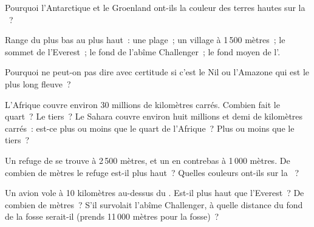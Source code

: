 \begin{exercise}[$\star$]\label{exo:g4:world-physical-map:6}
Pourquoi l'Antarctique et le Groenland ont-ils la couleur des terres hautes
sur la ~?
\end{exercise}

\begin{exercise}[$\star\star$]\label{exo:g4:world-physical-map:7}
Range du plus bas au plus haut~: une plage~; un village à 1\,500 mètres~;
le sommet de l'Everest~; le fond de l'abîme Challenger~; le fond moyen de
l'.
\end{exercise}

\begin{exercise}[$\star\star$]\label{exo:g4:world-physical-map:8}
Pourquoi ne peut-on pas dire avec certitude si c'est le Nil ou l'Amazone
qui est le plus long fleuve~?
\end{exercise}

\begin{exercise}[$\star\star$]\label{exo:g4:world-physical-map:9}
L'Afrique couvre environ 30 millions de kilomètres carrés. Combien fait le
quart~? Le tiers~? Le Sahara couvre environ huit millions et demi de
kilomètres carrés~: est-ce plus ou moins que le quart de l'Afrique~? Plus
ou moins que le tiers~?
\end{exercise}

\begin{exercise}[$\star\star$]\label{exo:g4:world-physical-map:10}
Un refuge de  se trouve à 2\,500 mètres, et un  en contrebas à
1\,000 mètres. De combien de mètres le refuge est-il plus haut~? Quelles
couleurs ont-ils sur la ~?
\end{exercise}

\begin{exercise}[$\star\star\star$]\label{exo:g4:world-physical-map:11}
Un avion vole à 10 kilomètres au-dessus du . Est-il plus
haut que l'Everest~? De combien de mètres~? S'il survolait l'abîme
Challenger, à quelle distance du fond de la fosse serait-il (prends
11\,000 mètres pour la fosse)~?
\end{exercise}
